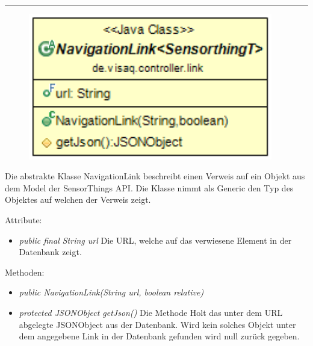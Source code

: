 \rule{\textwidth}{0.4pt}
\begin{minipage}{0.4\textwidth}
    \begin{figure}[H]
        {\centering\includegraphics[width=0.95\textwidth]{media/backend/controller/classes/NavigationLink.png}}
    \end{figure}
    \end{minipage} \hfill
\begin{minipage}{0.6\textwidth}
    Die abstrakte Klasse NavigationLink beschreibt einen Verweis auf ein Objekt aus dem Model der \gls{SensorThings API}.
    Die Klasse nimmt als Generic den Typ des Objektes auf welchen der Verweis zeigt.
\end{minipage}

Attribute:
\begin{itemize}
    \item \emph{public final String url} Die URL, welche auf das verwiesene Element in der Datenbank zeigt.
\end{itemize}
Methoden:
\begin{itemize}
    \item \emph{public NavigationLink(String url, boolean relative)}
    \relativeDescription
    \item \emph{protected JSONObject getJson()} Die Methode Holt das unter dem URL abgelegte JSONObject aus der Datenbank.
    Wird kein solches Objekt unter dem angegebene Link in der Datenbank gefunden wird null zurück gegeben.
\end{itemize}

